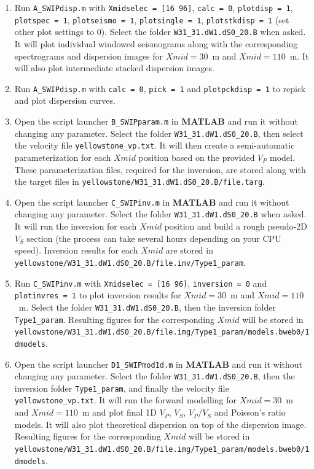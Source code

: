 \documentclass[twoside,a4paper]{article}
\def\MATLAB{\textbf{MATLAB}}
\begin{document}
\begin{enumerate}[leftmargin=*]
\item Run \verb|A_SWIPdisp.m| with \verb|Xmidselec = [16 96]|, \verb|calc = 0|, \verb|plotdisp = 1|, \verb|plotspec = 1|, \verb|plotseismo = 1|, \verb|plotsingle = 1|, \verb|plotstkdisp = 1| (set other plot settings to 0). Select the folder \verb|W31_31.dW1.dS0_20.B| when asked. It will plot individual windowed seismograms along with the corresponding spectrograms and dispersion images for $Xmid = 30$~m and $Xmid = 110$~m. It will also plot intermediate stacked dispersion images.

\item Run \verb|A_SWIPdisp.m| with \verb|calc = 0|, \verb|pick = 1| and \verb|plotpckdisp = 1| to repick and plot dispersion curves.

\item Open the script launcher \verb|B_SWIPparam.m| in {\MATLAB} and run it without changing any parameter. Select the folder \verb|W31_31.dW1.dS0_20.B|, then select the velocity file \verb|yellowstone_vp.txt|. It will then create a semi-automatic parameterization for each $Xmid$ position based on the provided $V_P$ model. These parameterization files, required for the inversion, are stored along with the target files in \verb|yellowstone/W31_31.dW1.dS0_20.B/file.targ|.

\item Open the script launcher \verb|C_SWIPinv.m| in {\MATLAB} and run it without changing any parameter. Select the folder \verb|W31_31.dW1.dS0_20.B| when asked. It will run the inversion for each $Xmid$ position and build a rough pseudo-2D $V_S$ section (the process can take several hours depending on your CPU speed). Inversion results for each $Xmid$ are stored in \verb|yellowstone/W31_31.dW1.dS0_20.B/file.inv/Type1_param|.

\item Run \verb|C_SWIPinv.m| with \verb|Xmidselec = [16 96]|, \verb|inversion = 0| and \verb|plotinvres = 1| to plot inversion results for $Xmid = 30$~m and $Xmid = 110$~m. Select the folder \verb|W31_31.dW1.dS0_20.B|, then the inversion folder \verb|Type1_param|. Resulting figures for the corresponding $Xmid$ will be stored in \verb|yellowstone/W31_31.dW1.dS0_20.B/file.img/Type1_param/models.bweb0/1dmodels|.

\item Open the script launcher \verb|D1_SWIPmod1d.m| in {\MATLAB} and run it without changing any parameter. Select the folder \verb|W31_31.dW1.dS0_20.B|, then the inversion folder \verb|Type1_param|, and finally the velocity file \verb|yellowstone_vp.txt|. It will run the forward modelling for $Xmid = 30$~m and $Xmid = 110$~m and plot final 1D $V_P$, $V_S$, $V_P/V_S$ and Poisson's ratio models. It will also plot theoretical dispersion on top of the dispersion image. Resulting figures for the corresponding $Xmid$ will be stored in \verb|yellowstone/W31_31.dW1.dS0_20.B/file.img/Type1_param/models.bweb0/1dmodels|.


\end{enumerate}
\end{document}
